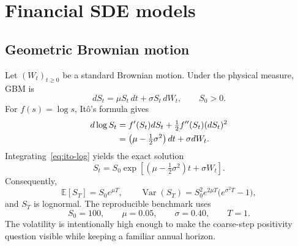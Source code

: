 \documentclass[11pt,a4paper]{article}
\theoremstyle{definition}
\theoremstyle{remark}
\begin{document}
\section{Financial SDE models}\label{sec:model}

\subsection{Geometric Brownian motion}
Let $(W_t)_{t\ge0}$ be a standard Brownian motion.  Under the physical measure,
GBM is
\begin{equation}
  dS_t=\mu S_t\,dt+\sigma S_t\,dW_t,\qquad S_0>0.
  \label{eq:gbm}
\end{equation}
For $f(s)=\log s$, It\^o's formula gives
\begin{align}
  d\log S_t
  &=f'(S_t)dS_t+\tfrac12 f''(S_t)(dS_t)^2 \notag\\
  &=\left(\mu-\tfrac12\sigma^2\right)dt+\sigma dW_t.
  \label{eq:ito-log}
\end{align}
Integrating~\eqref{eq:ito-log} yields the exact solution
\begin{equation}
  S_t=S_0\exp\!\left[\left(\mu-\tfrac12\sigma^2\right)t+\sigma W_t\right].
  \label{eq:gbm-exact}
\end{equation}
Consequently,
\begin{equation}
  \mathbb E[S_T]=S_0e^{\mu T},\qquad
  \operatorname{Var}(S_T)=S_0^2e^{2\mu T}\bigl(e^{\sigma^2T}-1\bigr),
  \label{eq:gbm-moments}
\end{equation}
and $S_T$ is lognormal.  The reproducible benchmark uses
\begin{equation}
  S_0=100,\qquad \mu=0.05,\qquad \sigma=0.40,\qquad T=1.
  \label{eq:gbm-params}
\end{equation}
The volatility is intentionally high enough to make the coarse-step positivity
question visible while keeping a familiar annual horizon.
\end{document}
